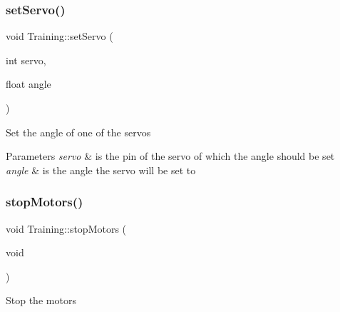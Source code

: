 \subsubsection{\texorpdfstring{setServo()}{setServo()}}
{\footnotesize\ttfamily void Training\+::set\+Servo (\begin{DoxyParamCaption}\item[{int}]{servo,  }\item[{float}]{angle }\end{DoxyParamCaption})}

Set the angle of one of the servos


\begin{DoxyParams}{Parameters}
{\em servo} & is the pin of the servo of which the angle should be set \\
\hline
{\em angle} & is the angle the servo will be set to \\
\hline
\end{DoxyParams}
\mbox{\label{namespace_training_a591534cde78f019ac71e59726b245d13}} 
\subsubsection{\texorpdfstring{stopMotors()}{stopMotors()}}
{\footnotesize\ttfamily void Training\+::stop\+Motors (\begin{DoxyParamCaption}\item[{void}]{ }\end{DoxyParamCaption})}

Stop the motors 